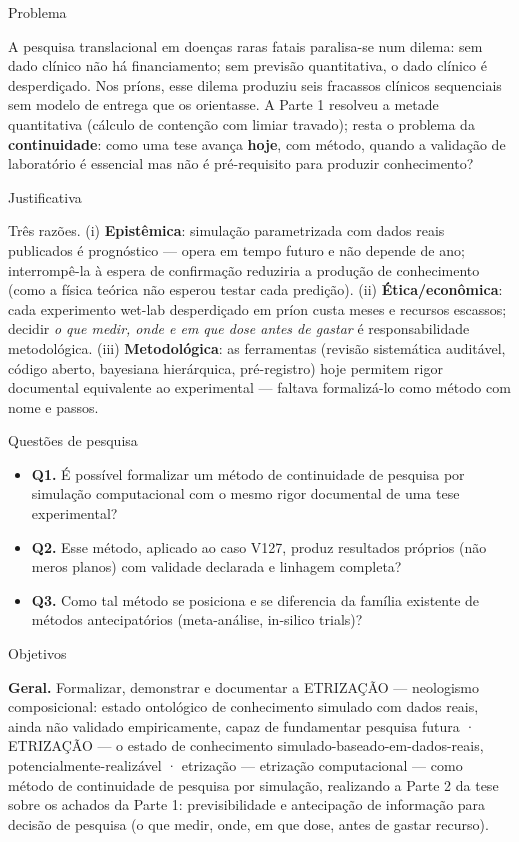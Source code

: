 \documentclass[12pt,a4paper,oneside]{report}
\providecommand{\tightlist}{\setlength{\itemsep}{2pt}\setlength{\parskip}{0pt}}
\begin{document}
Problema

A pesquisa translacional em doenças raras fatais paralisa-se num dilema:
sem dado clínico não há financiamento; sem previsão quantitativa, o dado
clínico é desperdiçado. Nos príons, esse dilema produziu seis fracassos
clínicos sequenciais sem modelo de entrega que os orientasse. A Parte 1
resolveu a metade quantitativa (cálculo de contenção com limiar
travado); resta o problema da \textbf{continuidade}: como uma tese
avança \textbf{hoje}, com método, quando a validação de laboratório é
essencial mas não é pré-requisito para produzir conhecimento?

Justificativa

Três razões. (i) \textbf{Epistêmica}: simulação parametrizada com dados
reais publicados é prognóstico --- opera em tempo futuro e não depende
de ano; interrompê-la à espera de confirmação reduziria a produção de
conhecimento (como a física teórica não esperou testar cada predição).
(ii) \textbf{Ética/econômica}: cada experimento wet-lab desperdiçado em
príon custa meses e recursos escassos; decidir \emph{o que medir, onde e
em que dose antes de gastar} é responsabilidade metodológica. (iii)
\textbf{Metodológica}: as ferramentas (revisão sistemática auditável,
código aberto, bayesiana hierárquica, pré-registro) hoje permitem rigor
documental equivalente ao experimental --- faltava formalizá-lo como
método com nome e passos.

Questões de pesquisa

\begin{itemize}
\tightlist
\item
  \textbf{Q1.} É possível formalizar um método de continuidade de
  pesquisa por simulação computacional com o mesmo rigor documental de
  uma tese experimental?
\item
  \textbf{Q2.} Esse método, aplicado ao caso V127, produz resultados
  próprios (não meros planos) com validade declarada e linhagem
  completa?
\item
  \textbf{Q3.} Como tal método se posiciona e se diferencia da família
  existente de métodos antecipatórios (meta-análise, in-silico trials)?
\end{itemize}

Objetivos

\textbf{Geral.} Formalizar, demonstrar e documentar a ETRIZAÇÃO ---
neologismo composicional: estado ontológico de conhecimento simulado com
dados reais, ainda não validado empiricamente, capaz de fundamentar
pesquisa futura · ETRIZAÇÃO --- o estado de conhecimento
simulado-baseado-em-dados-reais, potencialmente-realizável · etrização
--- etrização computacional --- como método de continuidade de pesquisa
por simulação, realizando a Parte 2 da tese sobre os achados da Parte 1:
previsibilidade e antecipação de informação para decisão de pesquisa (o
que medir, onde, em que dose, antes de gastar recurso).
\end{document}
